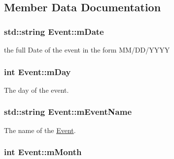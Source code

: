 \subsection{Member Data Documentation}
\subsubsection[{\texorpdfstring{m\+Date}{mDate}}]{\setlength{\rightskip}{0pt plus 5cm}std\+::string Event\+::m\+Date\hspace{0.3cm}{\ttfamily [private]}}\hypertarget{classEvent_a41ce1327717a5e72513db37c15d4e18a}{}\label{classEvent_a41ce1327717a5e72513db37c15d4e18a}


the full Date of the event in the form M\+M/\+D\+D/\+Y\+Y\+YY 

\subsubsection[{\texorpdfstring{m\+Day}{mDay}}]{\setlength{\rightskip}{0pt plus 5cm}int Event\+::m\+Day\hspace{0.3cm}{\ttfamily [private]}}\hypertarget{classEvent_a605a47d2ab6c0a393d6ab94b82afe3f3}{}\label{classEvent_a605a47d2ab6c0a393d6ab94b82afe3f3}


The day of the event. 

\subsubsection[{\texorpdfstring{m\+Event\+Name}{mEventName}}]{\setlength{\rightskip}{0pt plus 5cm}std\+::string Event\+::m\+Event\+Name\hspace{0.3cm}{\ttfamily [private]}}\hypertarget{classEvent_a7d545a7ff5a2e87bb503a80963c9c12e}{}\label{classEvent_a7d545a7ff5a2e87bb503a80963c9c12e}


The name of the \hyperlink{classEvent}{Event}. 

\subsubsection[{\texorpdfstring{m\+Month}{mMonth}}]{\setlength{\rightskip}{0pt plus 5cm}int Event\+::m\+Month\hspace{0.3cm}{\ttfamily [private]}}\hypertarget{classEvent_a1e481d4c0f234766f61e0ec4fc5170dd}{}\label{classEvent_a1e481d4c0f234766f61e0ec4fc5170dd}


